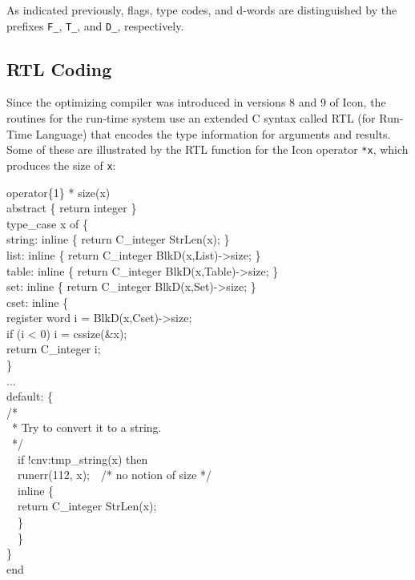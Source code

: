As indicated previously, flags, type codes, and d-words are
distinguished by the prefixes \texttt{F\_}, \texttt{T\_}, and
\texttt{D\_}, respectively.

\subsection{RTL Coding}

Since the optimizing compiler was introduced in versions 8 and 9 of
Icon, the routines for the run-time system use an extended C syntax
called RTL (for Run-Time Language) that encodes the type information
for arguments and results. Some of these are illustrated by the RTL
function for the Icon operator \texttt{*x}, which produces the size of
\texttt{x}:

\begin{iconcode}
\>operator\{1\} * size(x)\\
\>abstract \{ return integer \}\\
\>type\_case x of \{\\
\>\>string: inline \{ return C\_integer StrLen(x); \}\\
\>\>list: inline \{ return C\_integer BlkD(x,List)->size; \}\\
\>\>table: inline \{ return C\_integer BlkD(x,Table)->size; \}\\
\>\>set: inline \{ return C\_integer BlkD(x,Set)->size; \}\\
\>\>cset: inline \{\\
\>\>\>register word i = BlkD(x,Cset)->size;\\
\>\>\>if (i < 0) i = cssize(\&x);\\
\>\>\>return C\_integer i;\\
\>\>\>\}\\
\>\>...\\
\>\>default: \{\\
\>\>\>\>/*\\
\>\>\>\>\ * Try to convert it to a string.\\
\>\>\>\>\ */\\
\>\>\>\ \ if !cnv:tmp\_string(x) then\\
\>\>\>\>\ \ runerr(112, x);\ \ /* no notion of size */\\
\>\>\>\ \ inline \{\\
\>\>\>\>\ \ return C\_integer StrLen(x);\\
\>\>\>\>\ \ \}\\
\>\>\>\ \ \}\\
\>\>\}\\
end
\end{iconcode}

